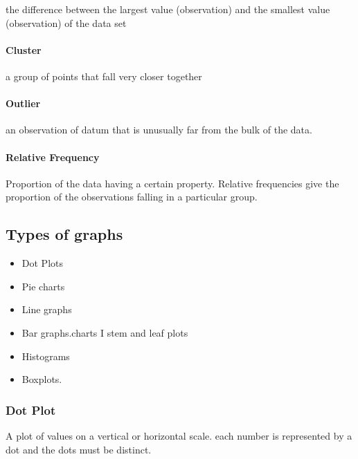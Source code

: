 \documentclass[]{article}
\providecommand{\tightlist}{%
  \setlength{\itemsep}{0pt}\setlength{\parskip}{0pt}}
\let\oldparagraph\paragraph
\renewcommand{\paragraph}[1]{\oldparagraph{#1}\mbox{}}
\begin{document}
the difference between the largest value (observation) and the smallest
value (observation) of the data set

\hypertarget{cluster-1}{%
\paragraph{Cluster}\label{cluster-1}}

a group of points that fall very closer together

\hypertarget{outlier-1}{%
\paragraph{Outlier}\label{outlier-1}}

an observation of datum that is unusually far from the bulk of the data.

\hypertarget{relative-frequency-1}{%
\paragraph{Relative Frequency}\label{relative-frequency-1}}

Proportion of the data having a certain property. Relative frequencies
give the proportion of the observations falling in a particular group.

\hypertarget{types-of-graphs}{%
\subsection{Types of graphs}\label{types-of-graphs}}

\begin{itemize}
\tightlist
\item
  Dot Plots
\item
  Pie charts
\item
  Line graphs
\item
  Bar graphs.charts I stem and leaf plots
\item
  Histograms
\item
  Boxplots.
\end{itemize}

\hypertarget{dot-plot}{%
\subsubsection{Dot Plot}\label{dot-plot}}

A plot of values on a vertical or horizontal scale. each number is
represented by a dot and the dots must be distinct.
\end{document}
